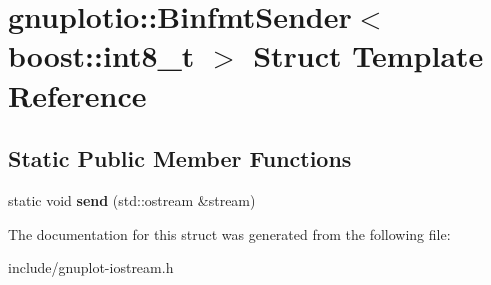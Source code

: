 \hypertarget{structgnuplotio_1_1BinfmtSender_3_01boost_1_1int8__t_01_4}{}\section{gnuplotio\+:\+:Binfmt\+Sender$<$ boost\+:\+:int8\+\_\+t $>$ Struct Template Reference}
\label{structgnuplotio_1_1BinfmtSender_3_01boost_1_1int8__t_01_4}
\subsection*{Static Public Member Functions}
\begin{DoxyCompactItemize}
\item 
\mbox{\label{structgnuplotio_1_1BinfmtSender_3_01boost_1_1int8__t_01_4_a6f61d43b0da25f044bfad0d45fe888b4}} 
static void {\bfseries send} (std\+::ostream \&stream)
\end{DoxyCompactItemize}


The documentation for this struct was generated from the following file\+:\begin{DoxyCompactItemize}
\item 
include/gnuplot-\/iostream.\+h\end{DoxyCompactItemize}
